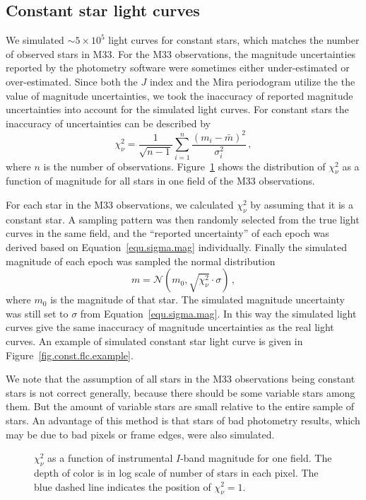 \subsection{Constant star light curves}

We simulated $\sim 5\times 10^5$ light curves for constant stars, which matches the number of observed stars in M33. For the M33 observations, the magnitude uncertainties reported by the photometry software were sometimes either under-estimated or over-estimated. Since both the $J$ index and the Mira periodogram utilize the the value of magnitude uncertainties, we took the inaccuracy of reported magnitude uncertainties into account for the simulated light curves. For constant stars the inaccuracy of uncertainties can be described by
\begin{equation}
\chi_\nu^2 = \frac{1}{\sqrt{n-1}}\sum_{i=1}^n\frac{(m_i-\bar m)^2}{\sigma_i^2}\,,
\end{equation}
where $n$ is the number of observations. Figure~\ref{fig.chi.dist.example} shows the distribution of $\chi_\nu^2$ as a function of magnitude for all stars in one field of the M33 observations.

For each star in the M33 observations, we calculated $\chi_\nu^2$ by assuming that it is a constant star. A sampling pattern was then randomly selected from the true light curves in the same field, and the ``reported uncertainty'' of each epoch was derived based on Equation~\ref{equ.sigma.mag} individually. Finally the simulated magnitude of each epoch was sampled the normal distribution
\begin{equation}
m = \mathcal{N}(m_0,\sqrt{\chi_\nu^2}\cdot\sigma)\,,
\end{equation}
where $m_0$ is the magnitude of that star. The simulated magnitude uncertainty was still set to $\sigma$ from Equation~\ref{equ.sigma.mag}. In this way the simulated light curves give the same inaccuracy of magnitude uncertainties as the real light curves. An example of simulated constant star light curve is given in Figure~\ref{fig.const.flc.example}.

We note that the assumption of all stars in the M33 observations being constant stars is not correct generally, because there should be some variable stars among them. But the amount of variable stars are small relative to the entire sample of stars. An advantage of this method is that stars of bad photometry results, which may be due to bad pixels or frame edges, were also simulated.


\begin{figure}
\caption{$\chi_\nu^2$ as a function of instrumental $I$-band magnitude for one field. The depth of color is in log scale of number of stars in each pixel. The blue dashed line indicates the position of $\chi_\nu^2=1$.}\label{fig.chi.dist.example}
\end{figure}

